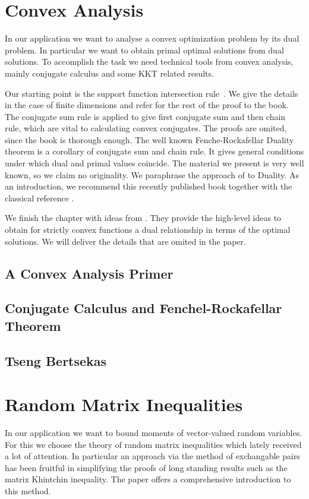 \documentclass[11pt, a4paper, BCOR=10mm, DIV=11]{scrbook}
\theoremstyle{definition}
\theoremstyle{plain}
\begin{document}
\chapter{Convex Analysis}
In our application we want to analyse a convex optimization problem by its dual problem.
In particular we want to obtain primal optimal solutions from dual solutions.
To accomplish the task we need technical tools from convex analysis, 
mainly conjugate calculus and some KKT related results.

Our starting point is the support function intersection rule~\cite[Theorem 4.23]{Mordukhovich2022}.
We give the details in the case of finite dimensions and refer for the rest of the proof to the book.
The conjugate sum rule is applied to give first conjugate sum and then chain rule,
which are vital to calculating convex conjugates. The proofs are omited, since the book is thorough enough. The well known Fenche-Rockafellar Duality theorem is a corollary of conjugate sum and chain rule. It gives general conditions under which dual and primal values coincide.
The material we present is very well known, so we claim no originality. 
We paraphrase the approach of \cite{Mordukhovich2022} to Duality. As an introduction, we recommend this recently published book together with the classical reference \cite{Rockafellar1970}.

We finish the chapter with ideas from \cite{Tseng1991}. They provide the high-level ideas to obtain for strictly convex functions a dual relationship in terms of the optimal solutions.
We will deliver the details that are omited in the paper.
  \section{A Convex Analysis Primer}
  
  \section{Conjugate Calculus and Fenchel-Rockafellar Theorem}
  
%
  \section{Tseng Bertsekas}
  


\chapter{Random Matrix Inequalities}
  In our application we want to bound moments of vector-valued random variables.
  For this we choose the theory of random matrix inequalities
  which lately received a lot of attention.
  In particular an approach via the method of exchangable pairs \cite{Mackey2014}
  has been fruitful in simplifying the proofs of long standing results such as the matrix Khintchin inequality.
  The paper offers a comprehensive introduction to this method.
\end{document}
